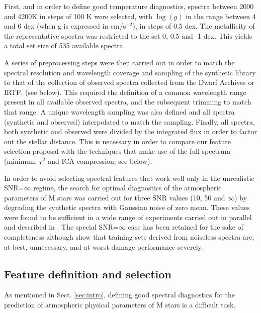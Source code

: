 First, and in order to define good temperature diagnostics, spectra
between 2000 and 4200K in steps of 100 K were selected, with $\log(g)$
in the range between 4 and 6 dex (when g is expressed in cm/s$^{-2}$),
in steps of 0.5 dex. The metallicity of the representative spectra was
restricted to the set 0, 0.5 and -1 dex.  This yields a total set size
of 535 available spectra.

A series of preprocessing steps were then carried out in order to
match the spectral resolution and wavelength coverage and sampling of
the synthetic library to that of the collection of observed spectra
collected from the Dwarf Archives or IRTF, (see below).  This required the
definition of a common wavelength range present in all available
observed spectra, and the subsequent trimming to match that range. A
unique wavelength sampling was also defined and all spectra (synthetic
and observed) interpolated to match the sampling. Finally, all
spectra, both synthetic and observed were divided by the integrated
flux in order to factor out the stellar distance. This is necessary in
order to compare our feature selection proposal with the techniques
that make use of the full spectrum (minimum $\chi^2$ and ICA
compression; see below).

In order to avoid selecting spectral features that work well only in
the unrealistic SNR=$\infty$ regime, the search for optimal
diagnostics of the atmospheric parameters of M stars was carried out
for three SNR values (10, 50 and $\infty$) by degrading the synthetic
spectra with Gaussian noise of zero mean. These values were found to
be sufficient in a wide range of experiments carried out in parallel
and described in \cite{2017MNRAS.465.4556G}. The special SNR=$\infty$
case has been retained for the sake of completeness
although \cite{2017MNRAS.465.4556G} show that training sets derived
from noiseless spectra are, at best, unnecessary, and at worst damage
performance severely.

\subsection{Feature definition and selection}
\label{subsec:FD}

As mentioned in Sect. \ref{sec:intro}, defining good spectral
diagnostics for the prediction of atmospheric physical parameters of M
stars is a difficult task.

